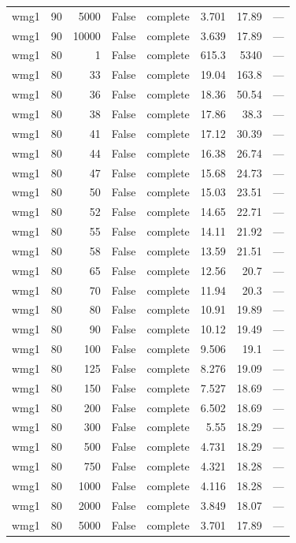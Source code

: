 \begin{tabular}{lrrrlrrl}
wmg1 & 90 & 5000 & False & complete & 3.701 & 17.89 & — \\
wmg1 & 90 & 10000 & False & complete & 3.639 & 17.89 & — \\
wmg1 & 80 & 1 & False & complete & 615.3 & 5340 & — \\
wmg1 & 80 & 33 & False & complete & 19.04 & 163.8 & — \\
wmg1 & 80 & 36 & False & complete & 18.36 & 50.54 & — \\
wmg1 & 80 & 38 & False & complete & 17.86 & 38.3 & — \\
wmg1 & 80 & 41 & False & complete & 17.12 & 30.39 & — \\
wmg1 & 80 & 44 & False & complete & 16.38 & 26.74 & — \\
wmg1 & 80 & 47 & False & complete & 15.68 & 24.73 & — \\
wmg1 & 80 & 50 & False & complete & 15.03 & 23.51 & — \\
wmg1 & 80 & 52 & False & complete & 14.65 & 22.71 & — \\
wmg1 & 80 & 55 & False & complete & 14.11 & 21.92 & — \\
wmg1 & 80 & 58 & False & complete & 13.59 & 21.51 & — \\
wmg1 & 80 & 65 & False & complete & 12.56 & 20.7 & — \\
wmg1 & 80 & 70 & False & complete & 11.94 & 20.3 & — \\
wmg1 & 80 & 80 & False & complete & 10.91 & 19.89 & — \\
wmg1 & 80 & 90 & False & complete & 10.12 & 19.49 & — \\
wmg1 & 80 & 100 & False & complete & 9.506 & 19.1 & — \\
wmg1 & 80 & 125 & False & complete & 8.276 & 19.09 & — \\
wmg1 & 80 & 150 & False & complete & 7.527 & 18.69 & — \\
wmg1 & 80 & 200 & False & complete & 6.502 & 18.69 & — \\
wmg1 & 80 & 300 & False & complete & 5.55 & 18.29 & — \\
wmg1 & 80 & 500 & False & complete & 4.731 & 18.29 & — \\
wmg1 & 80 & 750 & False & complete & 4.321 & 18.28 & — \\
wmg1 & 80 & 1000 & False & complete & 4.116 & 18.28 & — \\
wmg1 & 80 & 2000 & False & complete & 3.849 & 18.07 & — \\
wmg1 & 80 & 5000 & False & complete & 3.701 & 17.89 & — \\

\end{tabular}
